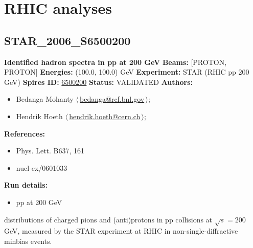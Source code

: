 \clearpage


\section{RHIC analyses}\subsection[STAR\_2006\_S6500200]{STAR\_2006\_S6500200\,\cite{Adams:2006nd}}
\textbf{Identified hadron spectra in pp at 200 GeV}\newline
\textbf{Beams:} [PROTON, PROTON] \newline
\textbf{Energies:} (100.0, 100.0) GeV \newline
\textbf{Experiment:} STAR (RHIC pp 200 GeV) \newline
\textbf{Spires ID:} \href{http://www.slac.stanford.edu/spires/find/hep/www?rawcmd=key+6500200}{6500200}\newline
\textbf{Status:} VALIDATED\newline
\textbf{Authors:}
\begin{itemize}
  \item Bedanga Mohanty $\langle\,$\href{mailto:bedanga@rcf.bnl.gov}{bedanga@rcf.bnl.gov}$\,\rangle$;
  \item Hendrik Hoeth $\langle\,$\href{mailto:hendrik.hoeth@cern.ch}{hendrik.hoeth@cern.ch}$\,\rangle$;
\end{itemize}
\textbf{References:}
\begin{itemize}
  \item Phys. Lett. B637, 161
  \item nucl-ex/0601033
\end{itemize}
\textbf{Run details:}
\begin{itemize}

  \item pp at 200 GeV\end{itemize}

\noindent \pT distributions of charged pions and (anti)protons in pp collisions at $\sqrt{s} = 200$ GeV, measured by the STAR experiment at RHIC in non-single-diffractive minbias events.

\clearpage


\clearpage


